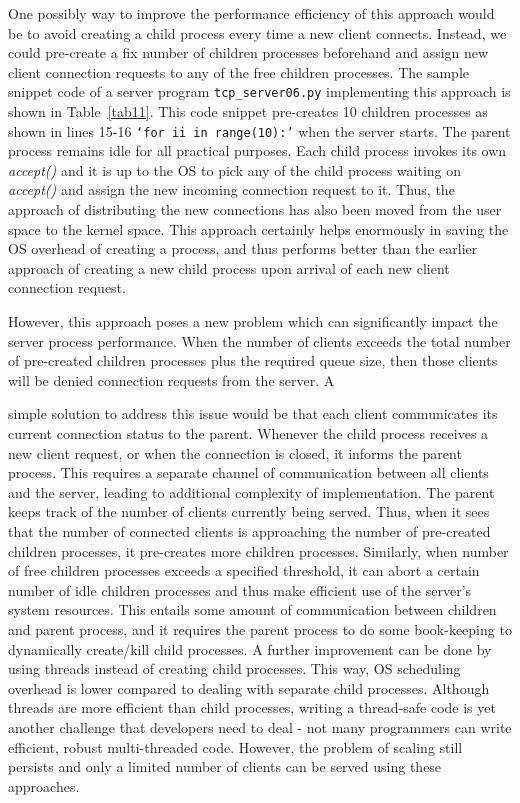 \begin{multicols}{2}

One possibly way to improve the performance efficiency of this approach would be to avoid creating a child process every time a new client connects. Instead, we could pre-create a fix number of children processes beforehand and assign new client connection requests to any of the free children processes. The sample snippet code of a server program \texttt{tcp\_server06.py} \cite{art1-key17} implementing this approach is shown in Table~\ref{tab11}.  This code snippet pre-creates 10 children processes as shown in lines 15-16  \texttt{‘for ii in range(10):’} when the server starts. The parent process remains idle for all practical purposes. Each child process invokes its own \textit{accept()} and it is up to the OS to pick any of the child process waiting on \textit{accept()} and assign the new incoming connection request to it. Thus, the approach of distributing the new connections has also been moved from the user space to the kernel space. This approach certainly helps enormously in saving the OS overhead of creating a process, and thus performs better than the earlier approach of creating a new child process upon arrival of each new client connection request.

However, this approach poses a new problem which can significantly impact the server process performance. When the number of clients exceeds the total number of pre-created children processes plus the required queue size, then those clients will be denied connection requests from the server. A 

simple solution to address this issue would be that each client communicates its current connection status to the parent. Whenever the child process receives a new client request, or when the connection is closed, it informs the parent process. This requires a separate channel of communication between all clients and the server, leading to additional complexity of implementation. The parent keeps track of the number of clients currently being served. Thus, when it sees that the number of connected clients is approaching the number of pre-created children processes, it pre-creates more children processes. Similarly, when number of free children processes exceeds a specified threshold, it can abort a certain number of idle children processes and thus make efficient use of the server’s system resources. This entails some amount of communication between children and parent process, and it requires the parent process to do some book-keeping to dynamically create/kill child processes. A further improvement can be done by using threads instead of creating child processes. This way, OS scheduling overhead is lower compared to dealing with separate child processes. Although threads are more efficient than child processes, writing a thread-safe code is yet another challenge that developers need to deal - not many programmers can write efficient, robust multi-threaded code. However, the problem of scaling still persists and only a limited number of clients can be served using these approaches. 
\end{multicols}

